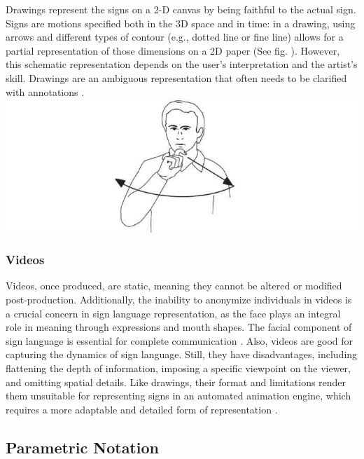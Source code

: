 Drawings represent the signs on a 2-D canvas by being faithful to the actual sign.
Signs are motions specified both in the 3D space and in time: in a drawing, using arrows and different types of contour (e.g., dotted line or fine line) allows for a partial representation of those dimensions on a 2D paper (See fig. ). However, this schematic representation depends on the user's interpretation and the artist's skill. Drawings are an ambiguous representation that often needs to be clarified with annotations \parencite{naert2020survey}.\\

\includegraphics[width=\textwidth]{figures/drawing-isl.jpg}



\subsubsection{Videos}

Videos, once produced, are static, meaning they cannot be altered or modified post-production. Additionally, the inability to anonymize individuals in videos is a crucial concern in sign language representation, as the face plays an integral role in meaning through expressions and mouth shapes. The facial component of sign language is essential for complete communication \parencite{kipp2011assessing}. Also, videos are good for capturing the dynamics of sign language. Still, they have disadvantages, including flattening the depth of information, imposing a specific viewpoint on the viewer, and omitting spatial details. Like drawings, their format and limitations render them unsuitable for representing signs in an automated animation engine, which requires a more adaptable and detailed form of representation \parencite{naert2020survey}.

\subsection{Parametric Notation}

